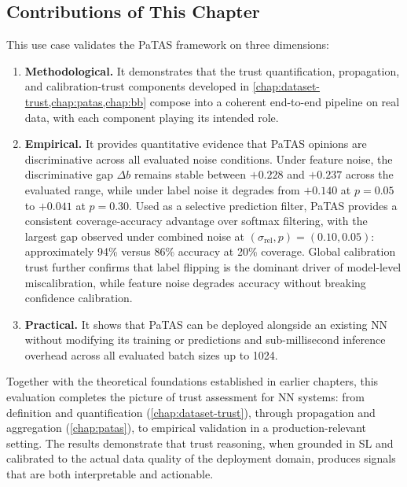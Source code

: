 \subsection*{Contributions of This Chapter}

This use case validates the \ac{PaTAS} framework on three dimensions:

\begin{enumerate}
    \item \textbf{Methodological.} It demonstrates that the trust quantification, propagation, and calibration-trust components developed in \cref{chap:dataset-trust,chap:patas,chap:bb} compose into a coherent end-to-end pipeline on real data, with each component playing its intended role.
    \item \textbf{Empirical.} It provides quantitative evidence that \ac{PaTAS} opinions are discriminative across all evaluated noise conditions. Under feature noise, the discriminative gap $\Delta b$ remains stable between $+0.228$ and $+0.237$ across the evaluated range, while under label noise it degrades from $+0.140$ at $p = 0.05$ to $+0.041$ at $p = 0.30$. Used as a selective prediction filter, \ac{PaTAS} provides a consistent coverage-accuracy advantage over softmax filtering, with the largest gap observed under combined noise at $(\sigma_{\text{rel}}, p) = (0.10, 0.05)$: approximately 94\% versus 86\% accuracy at 20\% coverage. Global calibration trust further confirms that label flipping is the dominant driver of model-level miscalibration, while feature noise degrades accuracy without breaking confidence calibration.
    \item \textbf{Practical.} It shows that \ac{PaTAS} can be deployed alongside an existing \ac{NN} without modifying its training or predictions and sub-millisecond inference overhead across all evaluated batch sizes up to 1024.
\end{enumerate}

Together with the theoretical foundations established in earlier chapters, this evaluation completes the picture of trust assessment for \ac{NN} systems: from definition and quantification (\cref{chap:dataset-trust}), through propagation and aggregation (\cref{chap:patas}), to empirical validation in a production-relevant setting. The results demonstrate that trust reasoning, when grounded in \ac{SL} and calibrated to the actual data quality of the deployment domain, produces signals that are both interpretable and actionable.






